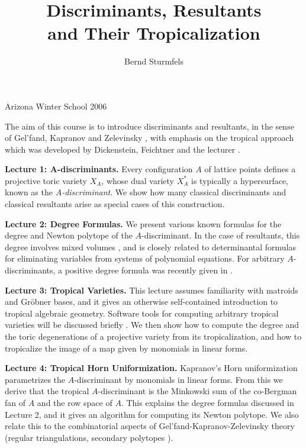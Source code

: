 \documentclass[12pt]{amsart}
\theoremstyle{plain}
\theoremstyle{definition}
\numberwithin{equation}{section}
\begin{document}
\title{Discriminants, Resultants  \\ and Their Tropicalization}

\author{Bernd Sturmfels}

\centerline{Arizona Winter School 2006}

\maketitle

The aim of this course is to introduce discriminants and resultants,
 in the sense of Gel'fand, Kapranov and Zelevinsky \cite{GKZ},
 with emphasis on the tropical approach which was developed
 by  Dickenstein, Feichtner and the lecturer \cite{DFS}.
 
 \bigskip
 
{\bf Lecture 1: A-discriminants.}
Every configuration $A$ of lattice points defines a projective
toric variety $X_A$, whose dual variety $X_A^*$ is typically
a hypersurface, known as the {\em $A$-discriminant}.
We show how many classical discriminants and
classical resultants arise as special cases of this construction.

\medskip

{\bf Lecture 2: Degree Formulas.}
We present various known formulas for the degree
and Newton polytope of the $A$-discriminant. In the case
of resultants,  this degree involves mixed volumes \cite{BS},
and is closely related 
to determinantal formulas for eliminating 
variables from systems of polynomial equations.
For arbitrary $A$-discriminants, a positive
 degree formula was recently given in \cite{DFS}.

\medskip

{\bf Lecture 3: Tropical Varieties.} This lecture
 assumes familiarity with matroids and Gr\"obner bases,
 and it gives an otherwise self-contained introduction to
 tropical algebraic geometry. Software tools for computing
 arbitrary tropical varieties will be discussed briefly  \cite{BJSST}.
  We then show how to compute the
degree and the toric degenerations of a projective variety 
from its tropicalization, and how to tropicalize
the image of a map given by
monomials in linear forms.

\medskip

{\bf Lecture 4: Tropical Horn Uniformization.}
Kapranov's Horn uniformization \cite{K} parametrizes the
$A$-discriminant by monomials in linear forms.
From this we derive that the tropical $A$-discriminant
is the Minkowski sum of the co-Bergman fan of $A$
and the row space of $A$. This explains the degree formulas
discussed in Lecture 2, and it gives an algorithm
for computing its Newton polytope.
  We also  relate this to the combinatorial aspects
  of  Gel'fand-Kapranov-Zelevinsky theory
(regular triangulations, secondary polytopes \cite{GKZ}).
\end{document}
